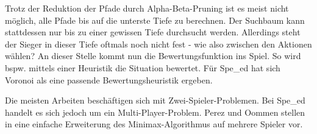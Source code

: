 Trotz der Reduktion der Pfade durch Alpha-Beta-Pruning ist es meist nicht möglich, alle Pfade bis auf die unterste Tiefe zu berechnen. Der Suchbaum kann stattdessen nur bis zu einer gewissen Tiefe durchsucht werden. Allerdings steht der Sieger in dieser Tiefe oftmals noch nicht fest - wie also zwischen den Aktionen w\"ahlen? An dieser Stelle kommt nun die Bewertungsfunktion ins Spiel. So wird bspw. mittels einer Heuristik die Situation bewertet. F\"ur Spe\_ed hat sich Voronoi als eine passende Bewertungsheuristik ergeben.

Die meisten Arbeiten beschäftigen sich mit Zwei-Spieler-Problemen. Bei Spe\_ed handelt es sich jedoch um ein Multi-Player-Problem. Perez und Oommen stellen in \cite{Perez.2019} eine einfache Erweiterung des Minimax-Algorithmus auf mehrere Spieler vor.


